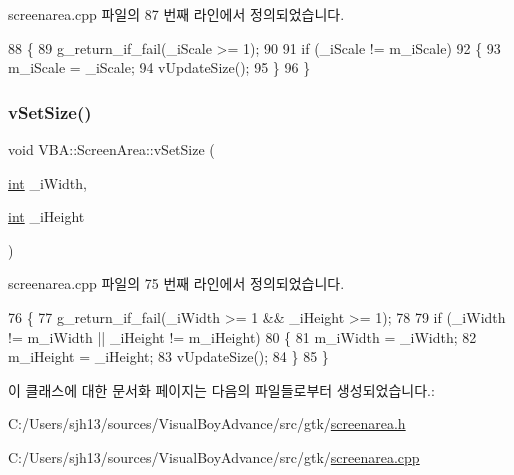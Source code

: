 screenarea.\+cpp 파일의 87 번째 라인에서 정의되었습니다.


\begin{DoxyCode}
88 \{
89   g\_return\_if\_fail(\_iScale >= 1);
90 
91   \textcolor{keywordflow}{if} (\_iScale != m\_iScale)
92   \{
93     m\_iScale = \_iScale;
94     vUpdateSize();
95   \}
96 \}
\end{DoxyCode}
\mbox{\label{class_v_b_a_1_1_screen_area_a67e85578c2affd30bfe40b8768900d83}} 
\subsubsection{\texorpdfstring{v\+Set\+Size()}{vSetSize()}}
{\footnotesize\ttfamily void V\+B\+A\+::\+Screen\+Area\+::v\+Set\+Size (\begin{DoxyParamCaption}\item[{\mbox{\hyperlink{_util_8cpp_a0ef32aa8672df19503a49fab2d0c8071}{int}}}]{\+\_\+i\+Width,  }\item[{\mbox{\hyperlink{_util_8cpp_a0ef32aa8672df19503a49fab2d0c8071}{int}}}]{\+\_\+i\+Height }\end{DoxyParamCaption})}



screenarea.\+cpp 파일의 75 번째 라인에서 정의되었습니다.


\begin{DoxyCode}
76 \{
77   g\_return\_if\_fail(\_iWidth >= 1 && \_iHeight >= 1);
78 
79   \textcolor{keywordflow}{if} (\_iWidth != m\_iWidth || \_iHeight != m\_iHeight)
80   \{
81     m\_iWidth  = \_iWidth;
82     m\_iHeight = \_iHeight;
83     vUpdateSize();
84   \}
85 \}
\end{DoxyCode}


이 클래스에 대한 문서화 페이지는 다음의 파일들로부터 생성되었습니다.\+:\begin{DoxyCompactItemize}
\item 
C\+:/\+Users/sjh13/sources/\+Visual\+Boy\+Advance/src/gtk/\mbox{\hyperlink{screenarea_8h}{screenarea.\+h}}\item 
C\+:/\+Users/sjh13/sources/\+Visual\+Boy\+Advance/src/gtk/\mbox{\hyperlink{screenarea_8cpp}{screenarea.\+cpp}}\end{DoxyCompactItemize}
